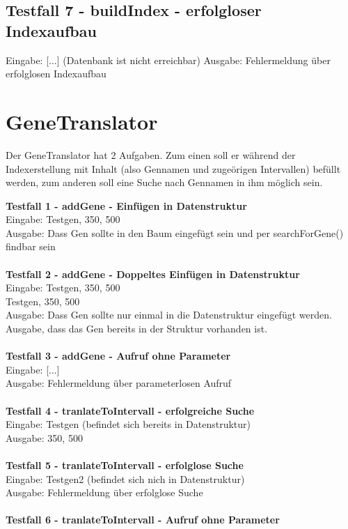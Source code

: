 \documentclass[]{article}
\begin{document}
\subsection{Testfall 7 - buildIndex - erfolgloser Indexaufbau}
Eingabe: [...] (Datenbank ist nicht erreichbar)
Ausgabe: Fehlermeldung über erfolglosen Indexaufbau
\newpage
\section{GeneTranslator}
Der GeneTranslator hat 2 Aufgaben. Zum einen soll er während der Indexerstellung mit Inhalt (also Gennamen und zugeörigen Intervallen) befüllt werden, zum anderen soll eine Suche nach Gennamen in ihm möglich sein.

\textbf{Testfall 1 - addGene - Einfügen in Datenstruktur}\\
Eingabe: Testgen, 350, 500\\
Ausgabe: Dass Gen sollte in den Baum eingefügt sein und per searchForGene() findbar sein\\
\\
\textbf{Testfall 2 - addGene - Doppeltes Einfügen in Datenstruktur}\\
Eingabe: Testgen, 350, 500\\
		 Testgen, 350, 500\\
Ausgabe: Dass Gen sollte nur einmal in die Datenstruktur eingefügt werden. Ausgabe, dass das Gen bereits in der Struktur vorhanden ist.\\
\\
\textbf{Testfall 3 - addGene - Aufruf ohne Parameter}\\
Eingabe: [...]\\
Ausgabe: Fehlermeldung über  parameterlosen Aufruf\\
\\
\textbf{Testfall 4 - tranlateToIntervall - erfolgreiche Suche}\\
Eingabe: Testgen (befindet sich bereits in Datenstruktur)\\
Ausgabe: 350, 500\\
\\
\textbf{Testfall 5 - tranlateToIntervall - erfolglose Suche}\\
Eingabe: Testgen2 (befindet sich nich in Datenstruktur)\\
Ausgabe: Fehlermeldung über erfolglose Suche\\
\\
\textbf{Testfall 6 - tranlateToIntervall - Aufruf ohne Parameter}\\
\end{document}
